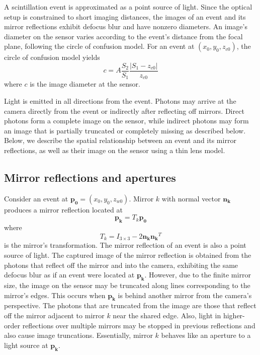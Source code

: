 
A scintillation event is approximated as a point source of light.
Since the optical setup is constrained to short imaging distances, 
the images of an event and its mirror reflections exhibit defocus blur and 
have nonzero diameters.
An image's diameter on the sensor varies according to the event's distance from 
the focal plane, following the circle of confusion model.
For an event at $(x_0,y_0,z_{c0})$, 
the circle of confusion model yields
\begin{equation} \label{eqn:circ_of_conf}
c=A\frac{S_2}{S_1}\frac{|S_1-z_{c0}|}{z_{c0}}
\end{equation}
where $c$ is the image diameter at the sensor.

Light is emitted in all directions from the event.
Photons may arrive at the camera directly from the event or indirectly after 
reflecting off mirrors.
Direct photons form a complete image on the sensor, while indirect photons may 
form an image that is partially truncated or completely missing as described below.
Below, we describe the spatial relationship between an event and its mirror 
reflections, as well as their image on the sensor using a thin lens model.

\subsection{Mirror reflections and apertures}

Consider an event at $\bm{p_0}=(x_0,y_0,z_{w0})$.
Mirror $k$ with normal vector $\bm{n_k}$ produces a mirror reflection located at 
\begin{equation}
\bm{p_k}=T_k\bm{p_0}
\end{equation}
where
\begin{equation} \label{eqn:ref_trans}
T_k=I_{3\times3} - 2\bm{n_k}\bm{n_k}^T
\end{equation}
is the mirror's transformation.
The mirror reflection of an event is also a point source of light.
The captured image of the mirror reflection is obtained from the photons that 
reflect off the mirror and into the camera, exhibiting the same defocus blur as if 
an event were located at $\bm{p_k}$.
However, due to the finite mirror size, the image on the sensor may be truncated 
along lines corresponding to the mirror's edges.
This occurs when $\bm{p_k}$ is behind another mirror from the camera's perspective.
The photons that are truncated from the image are those that reflect off the 
mirror adjacent to mirror $k$ near the shared edge.
Also, light in higher-order reflections over multiple mirrors may be stopped 
in previous reflections and also cause image truncations.
Essentially, mirror $k$ behaves like an aperture to a light source at $\bm{p_k}$. 

